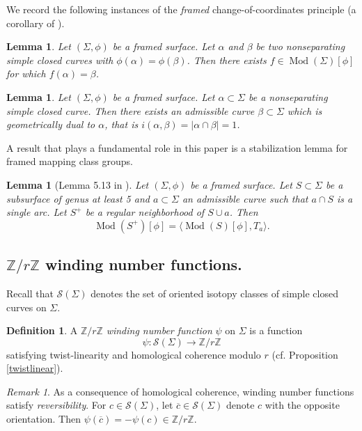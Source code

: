 \documentclass[10pt]{amsart}
\numberwithin{equation}{section}
\theoremstyle{plain}
\newtheorem{lemma}[theorem]{Lemma}
\theoremstyle{definition}
\newtheorem{defn}[theorem]{Definition}
\theoremstyle{remark}
\newtheorem{rmk}[theorem]{Remark}
\DeclareMathOperator{\Mod}{Mod}
\begin{document}
We record the following instances of the \textit{framed} change-of-coordinates principle (a corollary of \cite[Proposition 2.15]{Strata3}). 

\begin{lemma}
Let $(\Sigma,\phi)$ be a framed surface. Let $\alpha$ and $\beta$ be two nonseparating simple closed curves with $\phi(\alpha) = \phi(\beta)$. Then there exists $f \in \Mod(\Sigma)[\phi]$ for which $f(\alpha) = \beta$. 
\end{lemma}

\begin{lemma} \label{dualcurve}
Let $(\Sigma,\phi)$ be a framed surface. Let $\alpha \subset \Sigma$ be a nonseparating simple closed curve. Then there exists an admissible curve $\beta \subset \Sigma$ which is geometrically dual to $\alpha$, that is $i(\alpha,\beta) = |\alpha \cap \beta| = 1$. 
\end{lemma}


A result that plays a fundamental role in this paper is a stabilization lemma for framed mapping class groups. 
 \begin{lemma}[Lemma 5.13 in \cite{Strata3}]\label{stabilization}
 Let $(\Sigma,\phi)$ be a framed surface. Let $S \subset \Sigma$ be a subsurface of genus at least 5 and $a \subset \Sigma$ an admissible curve such that $a \cap S$ is a single arc. Let $S^+$ be a regular neighborhood of $S\cup a$. Then 
 $$ \Mod(S^+)[\phi] = \langle \Mod(S)[\phi],T_a\rangle.$$
 \end{lemma}




\subsection{$\mathbb{Z}/r\mathbb{Z}$ winding number functions.} Recall that $\mathcal{S}(\Sigma)$ denotes the set of oriented isotopy classes of simple closed curves on $\Sigma$.

\begin{defn}
A $\mathbb{Z}/r\mathbb{Z}$ \textit{winding number function} $\psi$ on $\Sigma$ is a function \[\psi : \mathcal{S}(\Sigma) \to \mathbb{Z}/r\mathbb{Z}\] satisfying twist-linearity and homological coherence modulo $r$ (cf. Proposition \ref{twistlinear}).
\end{defn}

\begin{rmk}
As a consequence of homological coherence, winding number functions satisfy \textit{reversibility}. For $c \in \mathcal{S}(\Sigma)$, let $\overline{c} \in \mathcal{S}(\Sigma)$ denote $c$ with the opposite orientation. Then $\psi(\overline{c}) = -\psi(c) \in \mathbb{Z}/r\mathbb{Z}$. 
\end{rmk}
\end{document}
